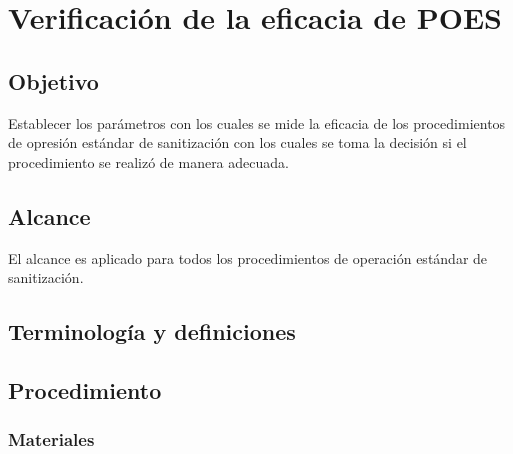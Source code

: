 \thispagestyle{formato-PI}
\renewcommand{\MenorVer}{0}
\renewcommand{\MayorVer}{2}
\renewcommand{\Codigo}{HYS-19-IT}
\renewcommand{\FechaPub}{2023--01}
\renewcommand{\Titulo}{Verificación de la eficacia de POES}

\section{\Titulo}

\subsection{Objetivo}

Establecer los parámetros con los cuales se mide la eficacia de los procedimientos de opresión estándar de sanitización con los cuales se toma la decisión si el procedimiento se realizó de manera adecuada.

\subsection{Alcance}

El alcance es aplicado para todos los procedimientos de operación estándar de sanitización.

\subsection{Terminología y definiciones}

\begin{description}
\end{description}



\subsection{Procedimiento}

\subsubsection{Materiales}

